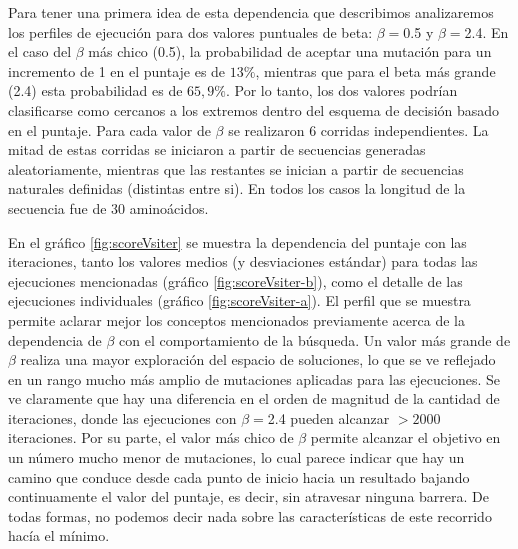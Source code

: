 Para tener una primera idea de esta dependencia que describimos analizaremos los perfiles de ejecución para dos valores puntuales de beta: $\beta=$0.5 y $\beta=$2.4.
En el caso del $\beta$ más chico (0.5), la probabilidad de aceptar una mutación para un incremento de 1 en el puntaje es de $13\%$, mientras que para el beta más grande (2.4) esta probabilidad es de $65,9\%$.
Por lo tanto, los dos valores podrían clasificarse como cercanos a los extremos dentro del esquema de decisión basado en el puntaje.
Para cada valor de $\beta$ se realizaron 6 corridas independientes.
La mitad de estas corridas se iniciaron a partir de secuencias generadas aleatoriamente, mientras que las restantes se inician a partir de secuencias naturales definidas (distintas entre si).
En todos los casos la longitud de la secuencia fue de 30 aminoácidos.


En el gráfico \ref{fig:scoreVsiter} se muestra la dependencia del puntaje con las iteraciones, tanto los valores medios (y desviaciones estándar) para todas las ejecuciones mencionadas (gráfico \ref{fig:scoreVsiter-b}), 
como el detalle de las ejecuciones individuales (gráfico \ref{fig:scoreVsiter-a}).
El perfil que se muestra permite aclarar mejor los conceptos mencionados previamente acerca de la dependencia de $\beta$ con el comportamiento de la búsqueda. 
Un valor más grande de $\beta$ realiza una mayor exploración del espacio de soluciones, lo que se ve reflejado en un rango mucho más amplio de mutaciones aplicadas para las ejecuciones.
Se ve claramente que hay una diferencia en el orden de magnitud de la cantidad de iteraciones, donde las ejecuciones con $\beta=$2.4 pueden alcanzar $>2000$ iteraciones.
Por su parte, el valor más chico de $\beta$ permite alcanzar el objetivo en un número mucho menor de mutaciones, lo cual parece indicar que hay un camino 
que conduce desde cada punto de inicio hacia un resultado bajando continuamente el valor del puntaje, es decir, sin atravesar ninguna barrera.
De todas formas, no podemos decir nada sobre las características de este recorrido hacía el mínimo.

